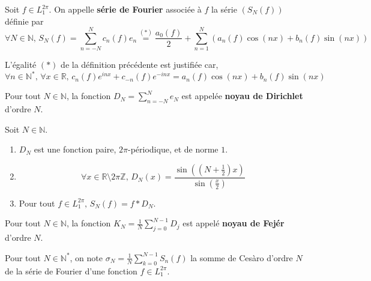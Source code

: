 
  \begin{definition}
    Soit $f \in L_1^{2\pi}$. On appelle \textbf{série de Fourier} associée à $f$ la série $(S_N(f))$ définie par
    \[ \forall N \in \mathbb{N}, \, S_N(f) = \sum_{n=-N}^{N} c_n(f) e_n \overset{(*)}{=} \frac{a_0(f)}{2} + \sum_{n = 1}^N (a_n(f) \cos(nx) + b_n(f) \sin(nx)) \]
  \end{definition}

  \begin{remark}
    L'égalité $(*)$ de la définition précédente est justifiée car,
    \[ \forall n \in \mathbb{N}^*, \, \forall x \in \mathbb{R}, \, c_n(f) e^{inx} + c_{-n}(f) e^{-inx} = a_n(f) \cos(nx) + b_n(f) \sin(nx) \]
  \end{remark}


  \begin{definition}
    Pour tout $N \in \mathbb{N}$, la fonction $D_N = \sum_{n=-N}^{N} e_N$ est appelée \textbf{noyau de Dirichlet} d'ordre $N$.
  \end{definition}

  \begin{proposition}
    Soit $N \in \mathbb{N}$.
    \begin{enumerate}[label=(\roman*)]
      \item $D_N$ est une fonction paire, $2\pi$-périodique, et de norme $1$.
      \item \[ \forall x \in \mathbb{R} \setminus 2 \pi \mathbb{Z}, \, D_N(x) = \frac{\sin \left(\left( N + \frac{1}{2} \right) x \right)}{\sin \left( \frac{x}{2} \right)} \]
      \item Pour tout $f \in L_1^{2 \pi}, \, S_N(f) = f * D_N$.
    \end{enumerate}
  \end{proposition}

  \begin{definition}
    Pour tout $N \in \mathbb{N}$, la fonction $K_N = \frac{1}{N} \sum_{j=0}^{N-1} D_j$ est appelé \textbf{noyau de Fejér} d'ordre $N$.
  \end{definition}

  \begin{notation}
    Pour tout $N \in \mathbb{N}^*$, on note $\sigma_N = \frac{1}{N} \sum_{k=0}^{N-1} S_n(f)$ la somme de Cesàro d'ordre $N$ de la série de Fourier d'une fonction $f \in L_1^{2 \pi}$.
  \end{notation}

